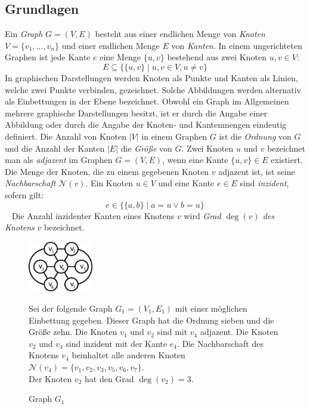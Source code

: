 \subsection{Grundlagen}
Ein \emph{Graph} $G = (V, E)$ besteht aus einer endlichen Menge von \emph{Knoten} $V = \{v_1 ,\ldots, v_n\}$ und einer endlichen Menge $E$ von \emph{Kanten}. In einem ungerichteten Graphen ist jede Kante $e$ eine Menge $\{u, v\}$ bestehend aus zwei Knoten $u, v \in V$:\vspace{-1mm}
$$E \subseteq \{\{u, v\}\; |\; u, v \in V, u \neq v\}$$
In graphischen Darstellungen werden Knoten als Punkte und Kanten als Linien, welche zwei Punkte verbinden, gezeichnet. Solche Abbildungen werden alternativ als Einbettungen in der Ebene bezeichnet. Obwohl ein Graph im Allgemeinen mehrere graphische Darstellungen besitzt, ist er durch die Angabe einer Abbildung oder durch die Angabe der Knoten- und Kantenmengen eindeutig definiert.\vspace{-1mm}\newline\newline
Die Anzahl von Knoten $|V|$ in einem Graphen $G$ ist die \emph{Ordnung} von $G$ und die Anzahl der Kanten $|E|$ die \emph{Größe} von $G$. Zwei Knoten $u$ und $v$ bezeichnet man als \emph{adjazent} im Graphen $G=(V,E)$, wenn eine Kante $\{u, v\} \in E$ existiert.\\Die Menge der Knoten, die zu einem gegebenen Knoten $v$ adjazent ist, ist seine \emph{Nachbarschaft} $\mathcal{N}(v)$. Ein Knoten $u \in V$ und eine Kante $e \in E$ sind \emph{inzident}, sofern gilt: \vspace{-1mm} $$e \in \{\{a,b\}\;|\;a=u \vee b=u\}$$ \vspace{-4mm}~\linebreak
Die Anzahl inzidenter Kanten eines Knotens $v$ wird \emph{Grad $\deg(v)$ des Knotens} $v$ bezeichnet.\\
\vspace{-8mm}
\begin{figure}
\begin{minipage}{145pt}
\centering
\includegraphics*[width = 80pt]{bilder/bsp2,1.pdf}
\label{bild:bsp1}
\caption{Graph $G_1$}
\end{minipage}
\begin{minipage}{280pt}
Sei der folgende Graph $G_1=(V_1,E_1)$ mit einer möglichen Einbettung gegeben.
Dieser Graph hat die Ordnung sieben und die Größe zehn. Die Knoten $v_1$ und $v_2$ sind mit $v_4$ adjazent. Die Knoten $v_2$ und $v_4$ sind inzident mit der Kante $e_4$. Die Nachbarschaft des Knotens $v_4$ beinhaltet alle anderen Knoten $\mathcal{N}(v_4)=\{v_1,v_2,v_3,v_5,v_6,v_7\}$.\\Der Knoten $v_2$ hat den Grad $\deg(v_2)=3$. 
\end{minipage}
\end{figure}
